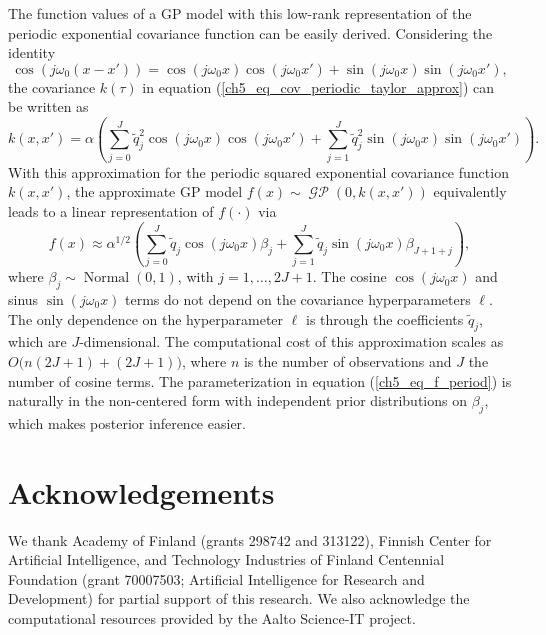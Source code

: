 \documentclass[onecolumn,a4paper,11pt]{article}
\DeclareMathOperator{\GP}{\mathcal{GP}}
\DeclareMathOperator{\Normal}{Normal}
\begin{document}
The function values of a GP model with this low-rank representation of the periodic exponential covariance function can be easily derived. Considering the identity
%
\begin{equation*}
\cos(j\omega_0 (x-x'))=\cos(j\omega_0 x) \cos(j\omega_0 x') + \sin(j\omega_0 x) \sin(j\omega_0 x'),
\end{equation*}
the covariance $k(\tau)$ in equation (\ref{ch5_eq_cov_periodic_taylor_approx}) can be written as
%
\begin{equation} \label{ch5_eq_cov_periodic_taylor_approx_2}
k(x,x')= \alpha \left( \sum_{j=0}^{J} \tilde{q}_j^2 \cos(j\omega_0 x)  \cos(j\omega_0 x') + \sum_{j=1}^{J} \tilde{q}_j^2 \sin(j\omega_0 x) \sin(j\omega_0 x') \right).
\end{equation}
With this approximation for the periodic squared exponential covariance function $k(x,x')$, the approximate GP model $f(x) \sim \GP\left(0,k(x,x')\right)$ equivalently leads to a linear representation of $f(\cdot)$ via
%
\begin{equation} \label{ch5_eq_f_period}
f(x) \approx \alpha^{1/2} \left( \sum_{j=0}^J  \tilde{q}_j \cos(j\omega_0 x) \beta_j +  \sum_{j=1}^J \tilde{q}_j \sin(j\omega_0 x) \beta_{J+1+j} \right),
\end{equation}
where $\beta_j \sim \Normal(0,1)$, with $j=1,\dots,2J+1$. The cosine $\cos(j\omega_0 x)$ and sinus $\sin(j\omega_0 x)$ terms do not depend on the covariance hyperparameters $\ell$. The only dependence on the hyperparameter $\ell$ is through the coefficients $\tilde{q}_j$, which are $J$-dimensional. The computational cost of this approximation scales as $O\big(n(2J+1) + (2J+1)\big)$, where $n$ is the number of observations and $J$ the number of cosine terms.
The parameterization in equation (\ref{ch5_eq_f_period}) is naturally in the non-centered form with independent prior distributions on
$\beta_j$, which makes posterior inference easier.



\section*{Acknowledgements}

We thank Academy of Finland (grants 298742 and 313122), Finnish Center
for Artificial Intelligence, and Technology Industries of Finland
Centennial Foundation (grant 70007503; Artificial Intelligence for
Research and Development) for partial support of this research. We
also acknowledge the computational resources provided by the Aalto
Science-IT project.



\end{document}
